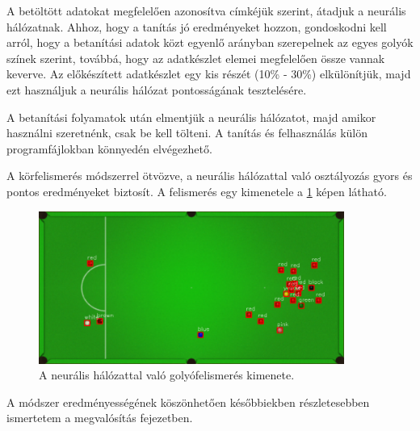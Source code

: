 \par A betöltött adatokat megfelelően azonosítva címkéjük szerint, átadjuk a neurális hálózatnak. Ahhoz, hogy a tanítás jó eredményeket hozzon, gondoskodni kell arról, hogy a betanítási adatok közt egyenlő arányban szerepelnek az egyes golyók színek szerint, továbbá, hogy az adatkészlet elemei megfelelően össze vannak keverve. Az előkészített adatkészlet egy kis részét (10\% - 30\%) elkülönítjük, majd ezt használjuk a neurális hálózat pontosságának tesztelésére.
\par A betanítási folyamatok után elmentjük a neurális hálózatot, majd amikor használni szeretnénk, csak be kell tölteni. A tanítás és felhasználás külön programfájlokban könnyedén elvégezhető.
\par A körfelismerés módszerrel ötvözve, a neurális hálózattal való osztályozás gyors és pontos eredményeket biztosít. A felismerés egy kimenetele a \ref{fig:felismert_asztal} képen látható.

\begin{figure}[!ht]
    \centering
    \includegraphics[width=100mm, keepaspectratio]{figures/recognised_table.png}
    \caption{A neurális hálózattal való golyófelismerés kimenete.}
    \label{fig:felismert_asztal}
\end{figure}

\par A módszer eredményességének köszönhetően későbbiekben részletesebben ismertetem a megvalósítás fejezetben.